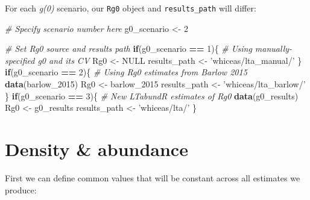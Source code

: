 \documentclass[
]{book}
\newenvironment{Shaded}{\begin{snugshade}}{\end{snugshade}}
\newcommand{\CommentTok}[1]{\textcolor[rgb]{0.56,0.35,0.01}{\textit{#1}}}
\newcommand{\ControlFlowTok}[1]{\textcolor[rgb]{0.13,0.29,0.53}{\textbf{#1}}}
\newcommand{\DecValTok}[1]{\textcolor[rgb]{0.00,0.00,0.81}{#1}}
\newcommand{\KeywordTok}[1]{\textcolor[rgb]{0.13,0.29,0.53}{\textbf{#1}}}
\newcommand{\NormalTok}[1]{#1}
\newcommand{\OperatorTok}[1]{\textcolor[rgb]{0.81,0.36,0.00}{\textbf{#1}}}
\newcommand{\OtherTok}[1]{\textcolor[rgb]{0.56,0.35,0.01}{#1}}
\newcommand{\StringTok}[1]{\textcolor[rgb]{0.31,0.60,0.02}{#1}}
\begin{document}
For each \emph{g(0)} scenario, our \texttt{Rg0} object and \texttt{results\_path} will differ:

\begin{Shaded}
\begin{Highlighting}[]
\CommentTok{# Specify scenario number here}
\NormalTok{g0_scenario <-}\StringTok{ }\DecValTok{2}
\end{Highlighting}
\end{Shaded}

\begin{Shaded}
\begin{Highlighting}[]
\CommentTok{# Set Rg0 source and results path}
\ControlFlowTok{if}\NormalTok{(g0_scenario }\OperatorTok{==}\StringTok{ }\DecValTok{1}\NormalTok{)\{ }\CommentTok{# Using manually-specified g0 and its CV}
\NormalTok{  Rg0 <-}\StringTok{ }\OtherTok{NULL}
\NormalTok{  results_path <-}\StringTok{ 'whiceas/lta_manual/'}
\NormalTok{\}}
\ControlFlowTok{if}\NormalTok{(g0_scenario }\OperatorTok{==}\StringTok{ }\DecValTok{2}\NormalTok{)\{ }\CommentTok{# Using Rg0 estimates from Barlow 2015}
  \KeywordTok{data}\NormalTok{(barlow_}\DecValTok{2015}\NormalTok{)}
\NormalTok{  Rg0 <-}\StringTok{ }\NormalTok{barlow_}\DecValTok{2015}
\NormalTok{  results_path <-}\StringTok{ 'whiceas/lta_barlow/'}
\NormalTok{\}}
\ControlFlowTok{if}\NormalTok{(g0_scenario }\OperatorTok{==}\StringTok{ }\DecValTok{3}\NormalTok{)\{ }\CommentTok{# New LTabundR estimates of Rg0}
  \KeywordTok{data}\NormalTok{(g0_results)}
\NormalTok{  Rg0 <-}\StringTok{ }\NormalTok{g0_results}
\NormalTok{  results_path <-}\StringTok{ 'whiceas/lta/'}
\NormalTok{\}}
\end{Highlighting}
\end{Shaded}

\hypertarget{density-abundance}{%
\section*{Density \& abundance}\label{density-abundance}}

First we can define common values that will be constant across all estimates we produce:
\end{document}
